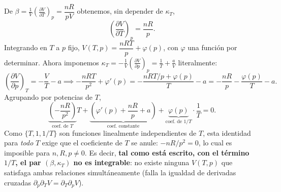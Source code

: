 \documentclass[12pt,a4paper]{article}
\newcommand{\paren}[1]{\left( #1 \right)}
\newcommand{\pd}[3]{\left(\frac{\partial #1}{\partial #2}\right)_{#3}}
\begin{document}
    \begin{solucion}
        De $\beta=\frac1V\pd VTp=\dfrac{nR}{pV}$ obtenemos, sin depender de $\kappa_{T}$,
        \begin{equation*}
            \pd{V}{T}{p}=\frac{nR}{p}.
        \end{equation*}
        Integrando en $T$ a $p$ fijo, $V(T,p)=\dfrac{nRT}{p}+\varphi(p)$, con $\varphi$ una
        función por determinar. Ahora imponemos $\kappa_{T}=-\frac1V\pd Vpp=\frac1T+\frac aV$
        literalmente:
        \begin{equation*}
            \pd{V}{p}{T}=-\frac{V}{T}-a
            \implies
            -\frac{nRT}{p^{2}}+\varphi'(p)=-\frac{nRT/p+\varphi(p)}{T}-a
            =-\frac{nR}{p}-\frac{\varphi(p)}{T}-a.
        \end{equation*}
        Agrupando por potencias de $T$,
        \begin{equation*}
            \underbrace{\paren{-\frac{nR}{p^{2}}}}_{\text{coef.\ de }T}T+\underbrace{\paren{\varphi'(p)+\frac{nR}{p}+a}}_{\text{coef.\ constante}}+\underbrace{\varphi(p)}_{\text{coef.\ de }1/T}\cdot\frac1T=0.
        \end{equation*}
        Como $\{T,1,1/T\}$ son funciones linealmente independientes de $T$, esta identidad para
        \emph{todo} $T$ exige que el coeficiente de $T$ se anule: $-nR/p^{2}=0$, lo cual es
        imposible para $n,R,p\neq0$. Es decir, \textbf{tal como está escrito, con el término
        $1/T$, el par $(\beta,\kappa_{T})$ no es integrable}: no existe ninguna $V(T,p)$ que
        satisfaga ambas relaciones simultáneamente (falla la igualdad de derivadas cruzadas
        $\partial_{p}\partial_{T}V=\partial_{T}\partial_{p}V$).


\end{solucion}
\end{document}

